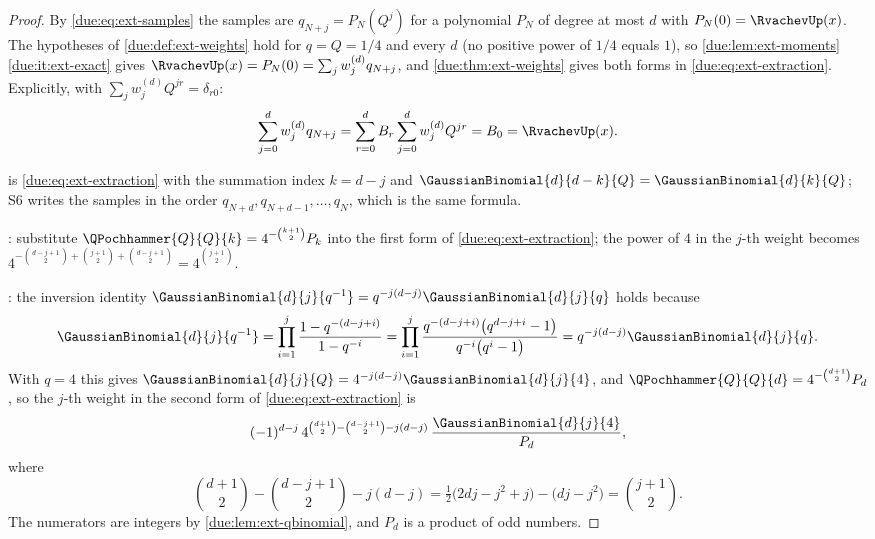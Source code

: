 \documentclass[11pt,oneside]{article}
\theoremstyle{plain}
\theoremstyle{definition}
\theoremstyle{remark}
\newcommand{\upn}[1]{\RvachevUp_{#1}}
\newcommand{\Qq}{Q}                                         %
\newcommand{\qn}[1]{q_{#1}}                                 %
\newcommand{\Wrow}[2]{w^{(#1)}_{#2}}                        %
\begin{document}
\begin{proof}
By \cref{due:eq:ext-samples} the samples are $\qn{N+j}=P_{N}(\Qq^{j})$ for a
polynomial $P_{N}$ of degree at most $d$ with $P_{N}(0)=\RvachevUp(x)$.
The hypotheses of \cref{due:def:ext-weights} hold for $q=\Qq=1/4$ and every
$d$ (no positive power of $1/4$ equals $1$), so
\cref{due:lem:ext-moments}\ref{due:it:ext-exact} gives
$\RvachevUp(x)=P_{N}(0)=\sum_{j}\Wrow{d}{j}\qn{N+j}$, and
\cref{due:thm:ext-weights} gives both forms in
\cref{due:eq:ext-extraction}.  Explicitly, with
$\sum_{j}\Wrow{d}{j}\Qq^{jr}=\delta_{r0}$:
\[
 \sum_{j=0}^{d}\Wrow{d}{j}\qn{N+j}
 =\sum_{r=0}^{d}B_{r}\sum_{j=0}^{d}\Wrow{d}{j}\Qq^{jr}
 =B_{0}=\RvachevUp(x).
\]

 is \cref{due:eq:ext-extraction} with the summation
index $k=d-j$ and $\GaussianBinomial{d}{d-k}{\Qq}=\GaussianBinomial{d}{k}{\Qq}$;
S6 writes the samples in the order $\qn{N+d},\qn{N+d-1},\ldots,\qn{N}$, which
is the same formula.

: substitute
$\QPochhammer{\Qq}{\Qq}{k}=4^{-\binom{k+1}{2}}P_{k}$ into the first form of
\cref{due:eq:ext-extraction}; the power of $4$ in the $j$-th weight becomes
$4^{-\binom{d-j+1}{2}+\binom{j+1}{2}+\binom{d-j+1}{2}}=4^{\binom{j+1}{2}}$.

: the inversion identity
$\GaussianBinomial{d}{j}{q^{-1}}=q^{-j(d-j)}\GaussianBinomial{d}{j}{q}$ holds
because
\[
 \GaussianBinomial{d}{j}{q^{-1}}
 =\prod_{i=1}^{j}\frac{1-q^{-(d-j+i)}}{1-q^{-i}}
 =\prod_{i=1}^{j}\frac{q^{-(d-j+i)}\bigl(q^{d-j+i}-1\bigr)}{q^{-i}\bigl(q^{i}-1\bigr)}
 =q^{-j(d-j)}\GaussianBinomial{d}{j}{q}.
\]
With $q=4$ this gives
$\GaussianBinomial{d}{j}{\Qq}=4^{-j(d-j)}\GaussianBinomial{d}{j}{4}$, and
$\QPochhammer{\Qq}{\Qq}{d}=4^{-\binom{d+1}{2}}P_{d}$, so the $j$-th weight in
the second form of \cref{due:eq:ext-extraction} is
\[
 (-1)^{d-j}\,4^{\binom{d+1}{2}-\binom{d-j+1}{2}-j(d-j)}\,
 \frac{\GaussianBinomial{d}{j}{4}}{P_{d}},
\]
where
\[
 \binom{d+1}{2}-\binom{d-j+1}{2}-j(d-j)
 =\tfrac12\bigl(2dj-j^{2}+j\bigr)-\bigl(dj-j^{2}\bigr)=\binom{j+1}{2}.
\]
The numerators are integers by \cref{due:lem:ext-qbinomial}, and $P_{d}$ is a
product of odd numbers.
\end{proof}
\end{document}
